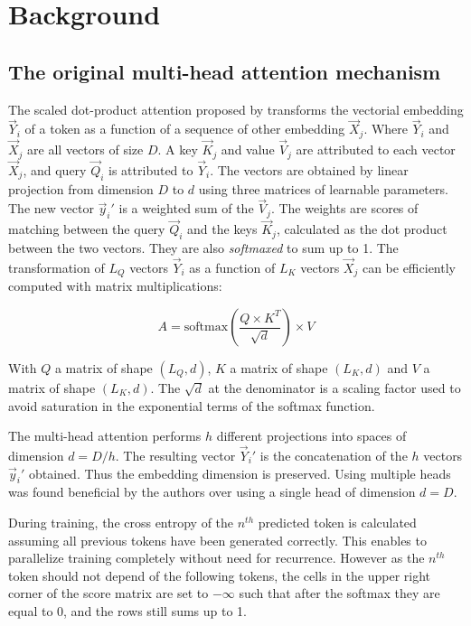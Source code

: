 \section{Background}

\subsection{The original multi-head attention
mechanism}

The scaled dot-product attention proposed by
\citet{vaswani2017attention} transforms the vectorial embedding $\vec{Y}_i$ of a token as a
 function of a sequence of other embedding $\vec{X}_j$. Where
 $\vec{Y}_i$ and $\vec{X}_j$ are all vectors of size $D$. A key
$\vec{K}_j$ and value $\vec{V}_j$ are attributed to each vector
$\vec{X}_j$, and query $\vec{Q}_i$ is attributed to $\vec{Y}_i$.
 The vectors are obtained by linear projection from dimension $D$ to $d$ using three matrices of learnable parameters. The new vector
 $\vec{y}_i'$ is a weighted sum of the $\vec{V}_j$. The weights are
 scores of matching between the query $\vec{Q}_i$ and the keys
$\vec{K}_j$, calculated as the dot product between the two vectors.
They are also \emph{softmaxed} to sum up to 1. The transformation of $L_Q$
vectors $\vec{Y}_i$ as a function of $L_K$ vectors $\vec{X}_j$ can
 be efficiently computed with matrix multiplications:

\begin{equation}
A = \mathrm{softmax}\left(\frac{Q \times K^T}{\sqrt{d}}\right) \times V
\end{equation}

With $Q$ a matrix of shape $(L_Q, d)$, $K$ a matrix of shape
 $(L_K, d)$ and $V$ a matrix of shape $(L_K, d)$. The $\sqrt{d}$
at the denominator is a scaling factor used to avoid saturation in the
exponential terms of the softmax function.

The multi-head attention performs $h$ different projections into spaces
 of dimension $d = D/h$. The resulting vector $\vec{Y}_i'$ is the
concatenation of the $h$ vectors $\vec{y}_i'$ obtained. Thus the
embedding dimension is preserved. Using multiple heads was found
beneficial by the authors over using a single head of dimension
$d = D$.

During training, the cross entropy of the $n^{th}$ predicted token is
 calculated assuming all previous tokens have been generated correctly.
 This enables to parallelize training completely without need for
recurrence. However as the $n^{th}$ token should not depend of the
following tokens, the cells in the upper right corner of the score
matrix are set to $-\infty$ such that after the softmax they are equal
to 0, and the rows still sums up to 1.

